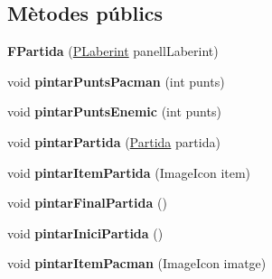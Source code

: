 \subsection*{Mètodes públics}
\begin{DoxyCompactItemize}
\item 
\hypertarget{classinterficie_1_1_f_partida_a6a73b8e78316fc26503ae3aaa9b1c646}{{\bfseries F\+Partida} (\hyperlink{classinterficie_1_1_p_laberint}{P\+Laberint} panell\+Laberint)}\label{classinterficie_1_1_f_partida_a6a73b8e78316fc26503ae3aaa9b1c646}

\item 
\hypertarget{classinterficie_1_1_f_partida_a2c19bf5a13e39dc3d48a87e121dd06db}{void {\bfseries pintar\+Punts\+Pacman} (int punts)}\label{classinterficie_1_1_f_partida_a2c19bf5a13e39dc3d48a87e121dd06db}

\item 
\hypertarget{classinterficie_1_1_f_partida_a5870ca61ba76baa48d77d57a8f063620}{void {\bfseries pintar\+Punts\+Enemic} (int punts)}\label{classinterficie_1_1_f_partida_a5870ca61ba76baa48d77d57a8f063620}

\item 
\hypertarget{classinterficie_1_1_f_partida_a52a4180cde3f2bd80e9bb635adca414c}{void {\bfseries pintar\+Partida} (\hyperlink{classlogica_1_1_partida}{Partida} partida)}\label{classinterficie_1_1_f_partida_a52a4180cde3f2bd80e9bb635adca414c}

\item 
\hypertarget{classinterficie_1_1_f_partida_a1430adb814777320b1d9f4860b717aae}{void {\bfseries pintar\+Item\+Partida} (Image\+Icon item)}\label{classinterficie_1_1_f_partida_a1430adb814777320b1d9f4860b717aae}

\item 
\hypertarget{classinterficie_1_1_f_partida_a485d826c1f5159836debae96a01f5206}{void {\bfseries pintar\+Final\+Partida} ()}\label{classinterficie_1_1_f_partida_a485d826c1f5159836debae96a01f5206}

\item 
\hypertarget{classinterficie_1_1_f_partida_a38b42acd1d5586b0ae1472745ffb9d8b}{void {\bfseries pintar\+Inici\+Partida} ()}\label{classinterficie_1_1_f_partida_a38b42acd1d5586b0ae1472745ffb9d8b}

\item 
\hypertarget{classinterficie_1_1_f_partida_aaaa9cf72ac9c6e237d13e823d20bcb93}{void {\bfseries pintar\+Item\+Pacman} (Image\+Icon imatge)}\label{classinterficie_1_1_f_partida_aaaa9cf72ac9c6e237d13e823d20bcb93}


\end{DoxyCompactItemize}
